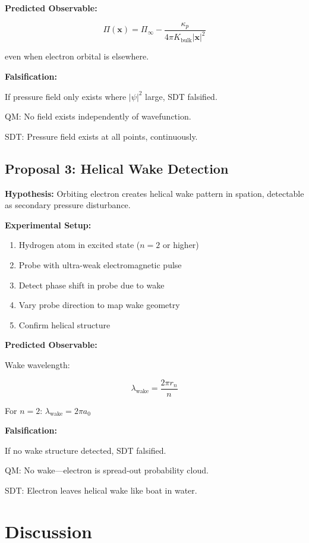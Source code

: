 \textbf{Predicted Observable:}

\begin{equation}
\Pi(\mathbf{x}) = \Pi_\infty - \frac{\kappa_p}{4\pi K_{\text{bulk}} |\mathbf{x}|^2}
\end{equation}

even when electron orbital is elsewhere.

\textbf{Falsification:}

If pressure field only exists where $|\psi|^2$ large, SDT falsified.

QM: No field exists independently of wavefunction.

SDT: Pressure field exists at all points, continuously.

\subsection{Proposal 3: Helical Wake Detection}

\textbf{Hypothesis:} Orbiting electron creates helical wake pattern in spation, detectable as secondary pressure disturbance.

\textbf{Experimental Setup:}

\begin{enumerate}
\item Hydrogen atom in excited state ($n=2$ or higher)
\item Probe with ultra-weak electromagnetic pulse
\item Detect phase shift in probe due to wake
\item Vary probe direction to map wake geometry
\item Confirm helical structure
\end{enumerate}

\textbf{Predicted Observable:}

Wake wavelength:

\begin{equation}
\lambda_{\text{wake}} = \frac{2\pi r_n}{n}
\end{equation}

For $n=2$: $\lambda_{\text{wake}} = 2\pi a_0$

\textbf{Falsification:}

If no wake structure detected, SDT falsified.

QM: No wake—electron is spread-out probability cloud.

SDT: Electron leaves helical wake like boat in water.

\section{Discussion}

